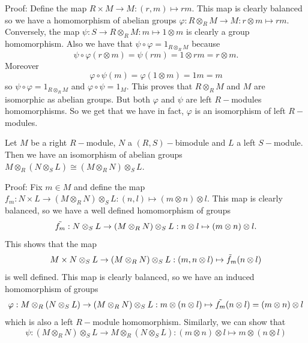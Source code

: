 Proof: Define the map $R\times M\rightarrow M:(r,m)\mapsto rm$. This map is clearly balanced so we have a homomorphism of abelian groups $\varphi:R\otimes_RM\rightarrow M:r\otimes m\mapsto rm$. Conversely, the map $\psi:S\rightarrow R\otimes_R M:m\mapsto 1\otimes m$ is clearly a group homomorphism. Also we have that $\psi\circ \varphi=1_{R\otimes_R M}$ because 
\begin{equation}
    \psi\circ \varphi(r\otimes m)=\psi(rm)=1\otimes rm=r\otimes m.
\end{equation}
Moreover
\begin{equation}
    \varphi\circ\psi(m)=\varphi(1\otimes m)=1m=m
\end{equation}
so $\psi\circ \varphi=1_{R\otimes_R M}$ and $\varphi\circ\psi=1_{M}$. This proves that $R\otimes_R M$ and $M$ are isomorphic as abelian groups. But both $\varphi$ and $\psi$ are left $R-$modules homomorphisms. So we get that we have in fact, $\varphi$ is an isomorphism of left $R-$modules.
\begin{dang}
    \begin{lemma}\label{lemma: associativity of tensor product of modules}
        Let $M$ be a right $R-$module, $N$ a $(R,S)-$bimodule and $L$ a left $S-$module. Then we have an isomorphism of abelian groups $M\otimes_R(N\otimes_S L)\cong (M\otimes_RN)\otimes_SL$.
    \end{lemma}
\end{dang}
Proof: Fix $m\in M$ and define the map $f_m:N\times L\rightarrow (M\otimes_RN)\otimes_SL:(n,l)\mapsto (m\otimes n)\otimes l$. This map is clearly balanced, so we have a well defined homomorphism of groups 
\begin{equation}
    \Tilde{f_m}:N\otimes_SL\rightarrow(M\otimes_RN)\otimes_SL:n\otimes l\mapsto (m\otimes n)\otimes l.
\end{equation}
This shows that the map
\begin{equation}
    M\times N\otimes_SL\rightarrow (M\otimes_RN)\otimes_SL: (m,n\otimes l)\mapsto \Tilde{f}_m(n\otimes l)
\end{equation}
is well defined. This map is clearly balanced, so we have an induced homomorphism of groups
\begin{equation}
    \varphi:  M\otimes_R( N\otimes_SL)\rightarrow (M\otimes_RN)\otimes_SL: m\otimes(n\otimes l)\mapsto \Tilde{f_m}(n\otimes l)=(m\otimes n)\otimes l
\end{equation}
which is also a left $R-$module homomorphism. Similarly, we can show that 
\begin{equation}
    \psi: (M\otimes_RN)\otimes_SL\rightarrow M\otimes_R( N\otimes_SL):(m\otimes n)\otimes l\mapsto m\otimes(n\otimes l)
\end{equation}
